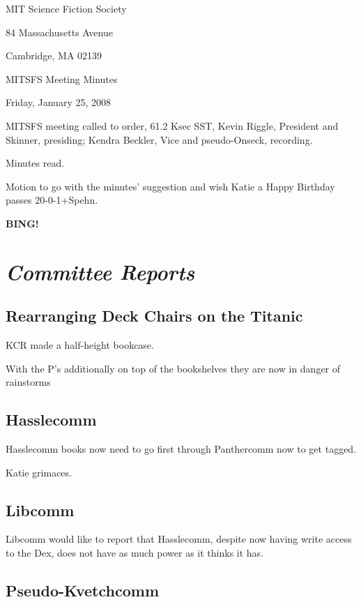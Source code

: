 \documentclass[10pt]{article}
\newcommand{\bing}{{\bf BING!} }
\newcommand{\goto}[1]{\bing \vskip 12pt \section*{{\em{#1}}}}
\begin{document}
\begin{center}

MIT Science Fiction Society

84 Massachusetts Avenue

Cambridge, MA 02139

\vspace{12pt}

MITSFS Meeting Minutes

Friday, January 25, 2008

\end{center}

\vspace{18pt}

\setlength{\parskip}{6pt}

\noindent
MITSFS meeting called to order, 61.2 Ksec SST,
Kevin Riggle, President and Skinner, presiding; Kendra Beckler, Vice and pseudo-Onseck, recording.

Minutes read.

Motion to go with the minutes' suggestion and wish Katie a Happy Birthday passes 20-0-1+Spehn.

\BING

\goto{Committee Reports}

\subsection*{Rearranging Deck Chairs on the Titanic}

KCR made a half-height bookcase.

With the P's additionally on top of the bookshelves they are now in danger of rainstorms

\subsection*{Hasslecomm}

Hasslecomm books now need to go first through Panthercomm now to get tagged.

Katie grimaces.

\subsection*{Libcomm}

Libcomm would like to report that Hasslecomm, despite now having write access to the Dex, does not have as much power as it thinks it has.

\subsection*{Pseudo-Kvetchcomm}
\end{document}
